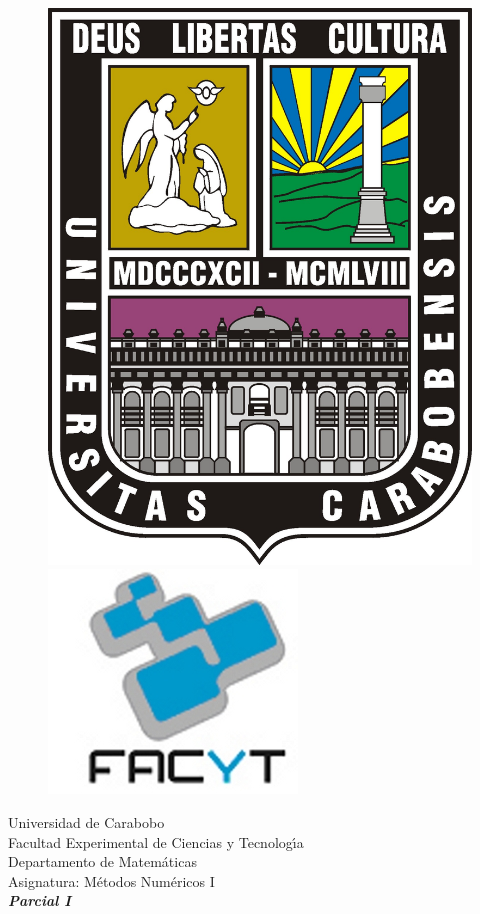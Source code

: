 \documentclass[12pt]{article}
\begin{document}
    \thispagestyle{empty}


    \begin{center}
        \begin{figure}[!h]
        \hspace{2cm}
        \includegraphics[scale=1]{LogoUC.jpg}
        \label{fig:hoo}
        \hspace{11cm}\includegraphics[scale=0.3]{FaCyT.jpg}
        \end{figure}
        \vspace{-2,5cm}
        Universidad de Carabobo \\ Facultad Experimental de Ciencias y
        Tecnolog\'{\i}a \\ Departamento de Matem\'{a}ticas\\ Asignatura:
        M\'etodos Num\'ericos I\\
        \vspace{1cm} {\it\bf\large Parcial I}\\
    \end{center}
\end{document}
